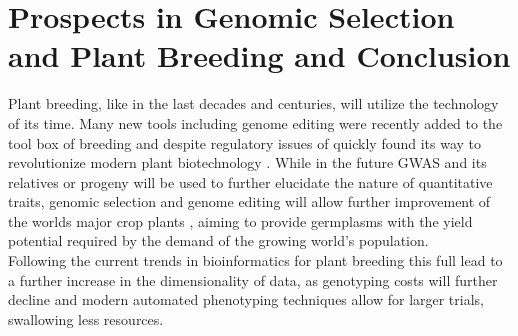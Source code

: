 \section{Prospects in Genomic Selection and Plant Breeding and Conclusion}
Plant breeding, like in the last decades and centuries, will utilize the technology of its
time. Many new tools including genome editing were recently added to the tool box of
breeding and despite regulatory issues of quickly found its way to revolutionize modern
plant biotechnology \cite{araki2015towards}. While in the future GWAS and its relatives or
progeny will be used to further elucidate the nature of quantitative traits, genomic
selection and genome editing will allow further improvement of the worlds major crop
plants \cite{rodriguez2017engineering}, aiming to provide germplasms with the yield
potential required by the demand of the growing world's population.\\
Following the current trends in bioinformatics for plant breeding this full lead to a
further increase in the dimensionality of data, as genotyping costs will further decline
and modern automated phenotyping techniques allow for larger trials, swallowing less
resources. 









